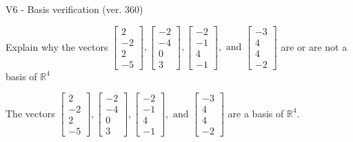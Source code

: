 \begin{exercise}
  \begin{exerciseTitle}V6 - Basis verification (ver. 360)\end{exerciseTitle}
  \begin{exerciseStatement}
    Explain why the vectors \(\left[\begin{array}{r}
2 \\
-2 \\
2 \\
-5
\end{array}\right] , \left[\begin{array}{r}
-2 \\
-4 \\
0 \\
3
\end{array}\right] , \left[\begin{array}{r}
-2 \\
-1 \\
4 \\
-1
\end{array}\right] , \text{ and } \left[\begin{array}{r}
-3 \\
4 \\
4 \\
-2
\end{array}\right]\) are or are not a basis of \(\mathbb{R}^4\)	


  \end{exerciseStatement}
  \begin{exerciseAnswer}
   The vectors \(\left[\begin{array}{r}
2 \\
-2 \\
2 \\
-5
\end{array}\right] , \left[\begin{array}{r}
-2 \\
-4 \\
0 \\
3
\end{array}\right] , \left[\begin{array}{r}
-2 \\
-1 \\
4 \\
-1
\end{array}\right] , \text{ and } \left[\begin{array}{r}
-3 \\
4 \\
4 \\
-2
\end{array}\right]\) 
  	 are  a basis of \(\mathbb{R}^4\).
  


  \end{exerciseAnswer}
\end{exercise}
